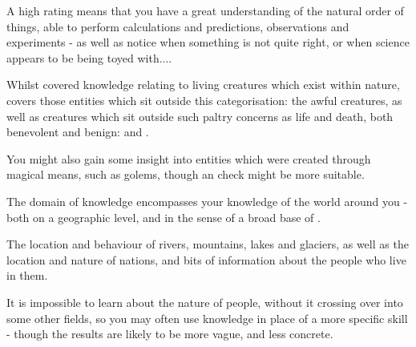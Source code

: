 A high  rating means that you have a great understanding of the natural order of things, able to perform calculations and predictions, observations and experiments - as well as notice when something is not quite right, or when science appears to be being toyed with....


Whilst  covered knowledge relating to living creatures which exist within nature,  covers those entities which sit outside this categorisation: the awful  creatures, as well as creatures which sit outside such paltry concerns as life and death, both benevolent and benign:  and . 

You might also gain some insight into entities which were created through magical means, such as golems, though an  check might be more suitable.




The  domain of knowledge encompasses your knowledge of the world around you - both on a geographic level, and in the sense of a broad base of . 

The location and behaviour of rivers, mountains, lakes and glaciers, as well as the location and nature of nations, and bits of information about the people who live in them. 

It is impossible to learn about the nature of people, without it crossing over into some other fields, so you may often use  knowledge in place of a more specific skill - though the results are likely to be more vague, and less concrete. 
